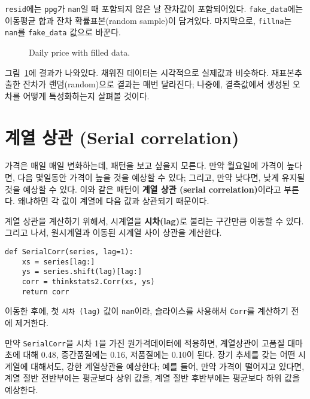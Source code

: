 {\tt resid}에는 {\tt ppg}가 {\tt nan}일 때 포함되지 않은 날 잔차값이 포함되어있다. \verb"fake_data"에는 이동평균 합과 잔차 확률표본(random sample)이 담겨있다. 마지막으로, {\tt fillna}는 {\tt nan}를 \verb"fake_data" 값으로 바꾼다.

\begin{figure}
\caption{Daily price with filled data.}
\label{timeseries8}
\end{figure}

그림~\ref{timeseries8}에 결과가 나와있다.
채워진 데이터는 시각적으로 실제값과 비슷하다.
재표본추출한 잔차가 랜덤(random)으로 결과는 매번 달라진다; 나중에,
결측값에서 생성된 오차를 어떻게 특성화하는지 살펴볼 것이다.



\section{계열 상관 (Serial correlation)}

가격은 매일 매일 변화하는데, 패턴을 보고 싶을지 모른다.
만약 월요일에 가격이 높다면, 다음 몇일동안 가격이 높을 것을 예상할 수 있다; 그리고, 만약 낮다면, 낮게 유지될 것을 예상할 수 있다.
이와 같은 패턴이 {\bf 계열 상관 (serial correlation)}이라고 부른다. 왜냐하면 각 값이 계열에 다음 값과 상관되기 때문이다.

계열 상관을 계산하기 위해서, 시계열을 {\bf 시차(lag)}로 불리는 구간만큼 이동할 수 있다. 그리고 나서, 원시계열과 이동된 시계열 사이 상관을 계산한다.

\begin{verbatim}
def SerialCorr(series, lag=1):
    xs = series[lag:]
    ys = series.shift(lag)[lag:]
    corr = thinkstats2.Corr(xs, ys)
    return corr
\end{verbatim}

이동한 후에, 첫 {\tt 시차 (lag)} 값이 {\tt nan}이라, 슬라이스를 사용해서 {\tt Corr}를 계산하기 전에 제거한다.


만약 {\tt SerialCorr}을 시차 1을 가진 원가격데이터에 적용하면, 계열상관이 고품질 대마초에 대해 0.48, 중간품질에는 0.16, 저품질에는 0.10이 된다.
장기 추세를 갖는 어떤 시계열에 대해서도, 강한 계열상관을 예상한다; 예를 들어, 만약 가격이 떨어지고 있다면, 계열 절반 전반부에는 평균보다 상위 값을, 계열 절반 후반부에는 평균보다 하위 값을 예상한다.

